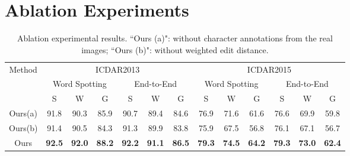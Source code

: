 \documentclass[runningheads]{llncs}
\begin{document}
\maketitle
\section{Ablation Experiments}
\begin{table}
\begin{centering}
\caption{Ablation experimental results. ``Ours (a)":  without character annotations from the real images; ``Ours (b)": without weighted edit distance.}
\label{tab_discussion}
\begin{tabular}{|c|c|c|c|c|c|c|c|c|c|c|c|c|}
\hline 
\multirow{3}{*}{Method} & \multicolumn{6}{c|}{ICDAR2013} & \multicolumn{6}{c|}{ICDAR2015}\tabularnewline
\cline{2-13} 
 & \multicolumn{3}{c|}{Word Spotting} & \multicolumn{3}{c|}{End-to-End} & \multicolumn{3}{c|}{Word Spotting} & \multicolumn{3}{c|}{End-to-End}\tabularnewline
\cline{2-13} 
 & S & W & G & S & W & G & S & W & G & S & W & G\tabularnewline
\hline 
Ours(a) &91.8 &90.3 &85.9 &90.7 &89.4 &84.6 &76.9 &71.6 &61.6 &76.6 &69.9 &59.8 \tabularnewline
\hline 
Ours(b) &91.4  &90.5  &84.3  &91.3  &89.9  &83.8  &75.9  &67.5  &56.8  &76.1  &67.1  &56.7 \tabularnewline
\hline 
Ours &\textbf{92.5}  &\textbf{92.0}  &\textbf{88.2} &\textbf{92.2}  &\textbf{91.1}  &\textbf{86.5}  &\textbf{79.3}  &\textbf{74.5}  &\textbf{64.2}  &\textbf{79.3}  &\textbf{73.0}  &\textbf{62.4} \tabularnewline
\hline 
\end{tabular}
\par\end{centering}
\end{table}
\end{document}
